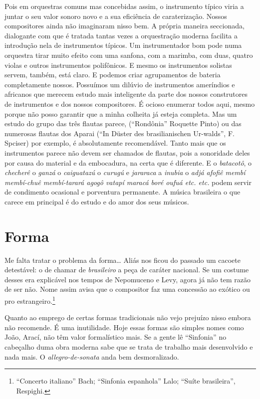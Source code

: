 Pois em orquestras comuns mas concebidas assim, o instrumento típico
viria a juntar o seu valor sonoro novo e a sua eficiência de
caraterização. Nossos compositores ainda não imaginaram nisso bem. A
própria maneira seccionada, dialogante com que é tratada tantas vezes a
orquestração moderna facilita a introdução nela de instrumentos típicos.
Um instrumentador bom pode numa orquestra tirar muito efeito com uma
sanfona, com a marimba, com duas, quatro violas e outros instrumentos
polifônicos. E mesmo os instrumentos solistas servem, também, está
claro. E podemos criar agrupamentos de bateria completamente nossos.
Possuímos um dilúvio de instrumentos ameríndios e africanos que merecem
estudo mais inteligente da parte dos nossos construtores de instrumentos
e dos nossos compositores. É ocioso enumerar todos aqui, mesmo porque
não posso garantir que a minha colheita já esteja completa. Mas um
estudo do grupo das três flautas parece, (``Rondônia'' Roquette Pinto) ou
das numerosas flautas dos Aparai (``In Düster des brasilianischen
Ur-walds'', F.\,Spciser) por exemplo, é absolutamente recomendável. Tanto
mais que os instrumentos parece não devem ser chamados de flautas, pois
a sonoridade deles por causa do material e da embocadura, na certa que é
diferente. E o \textit{batacotô}, o \textit{checherê} o \textit{ganzá} o \textit{caiguatazú} o \textit{curugú} e
\textit{jararaca} a \textit{inubia} o \textit{adjá afofiê membí membí-chuê membí-tarará agogô
vatapí maracá boré oufuá etc. etc.} podem servir de condimento ocasional
e porventura permanente. A música brasileira o que carece em principal é
do estudo e do amor dos seus músicos.

\section{Forma}

Me falta tratar o problema da forma\ldots{} Aliás nos ficou do passado um
cacoete detestável: o de chamar de \textit{brasileiro} a peça de caráter
nacional. Se um costume desses era explicável nos tempos de Nepomuceno e
Levy, agora já não tem razão de ser não. Nome assim avisa que o
compositor faz uma concessão ao exótico ou pro estrangeiro.\footnote{``Concerto
italiano'' Bach; ``Sinfonia espanhola'' Lalo; ``Suíte brasileira'',
Respighi.}

Quanto ao emprego de certas formas tradicionais não vejo prejuízo nisso
embora não recomende. É uma inutilidade. Hoje essas formas são simples
nomes como João, Arací, não têm valor formalístico mais. Se a gente lê
``Sinfonia'' no cabeçalho duma obra moderna sabe que se trata de trabalho
mais desenvolvido e nada mais. O \textit{allegro-de-sonata} anda bem
desmoralizado.

